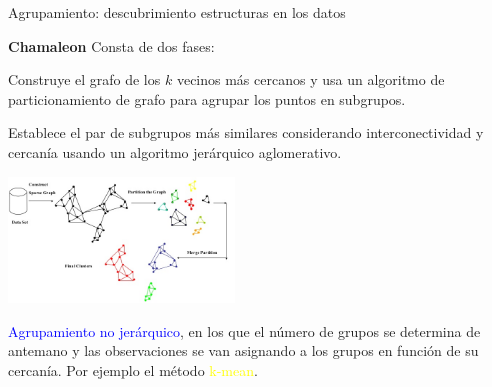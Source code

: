 \documentclass[11pt]{beamer}
\begin{document}
\begin{frame}{Agrupamiento: descubrimiento estructuras en los datos}

\begin{itemize}
 \scriptsize{\item \textbf{Chamaleon} Consta de dos fases:}
 	
 	\begin{itemize}
 	\scriptsize	{\item Construye el grafo de los $k$ vecinos m\'as cercanos y  usa un algoritmo de particionamiento de grafo para agrupar los puntos en subgrupos.}
 	\scriptsize {\item Establece   el   par   de   subgrupos   m\'as   similares   considerando interconectividad  y  cercan\'ia usando un algoritmo jer\'arquico aglomerativo.}    
 	\end{itemize}
 	
 \begin{center}
 	\includegraphics[width=0.45\textwidth]{ML13.png}	
 \end{center}
\end{itemize}
 
\begin{itemize}
	\scriptsize{\item \textcolor{blue}{Agrupamiento no jer\'arquico}, en los que el n\'umero de grupos se determina de antemano y las observaciones se van asignando a los grupos en funci\'on de su cercanía. Por ejemplo el m\'etodo \textcolor{yellow}{k-mean}.
		
}
\end{itemize}
\end{frame}
\end{document}

